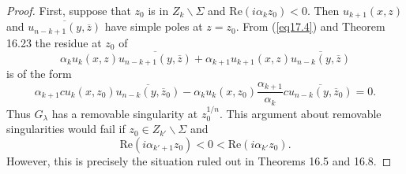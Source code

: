 \documentclass{surv-l}
\theoremstyle{plain}
\theoremstyle{definition}
\numberwithin{equation}{chapter}
\begin{document}
\begin{proof}  First,  suppose  that $z_{0}$ is in $ Z_{k}\backslash \Sigma$ and $\mathrm{Re}(i\alpha_{k}z_{0})<0$. Then $u_{k+1}(x,z)$ and $\overline{u_{n-k+1}(y,\overline{z})}$ have simple poles at $z=z_{0}$. From (\ref{eq17.4}) and Theorem 16.23 the residue at $z_{0}$ of
\begin{equation}\label{eq17.9}
\alpha_{k}u_{k}(x,z)\overline{u_{n-k+1}(y,\overline{z})}+\alpha_{k+1}u_{k+1}(x,z)\overline{u_{n-k}(y,\overline{z})}
\end{equation}
is of the form
\begin{equation}\label{eq17.10}
\alpha_{k+1}cu_{k}(x, z_{0})\overline{u_{n-k}(y,\overline{z}_{0})}-\alpha_{k}u_{k}(x,z_{0})\frac{\alpha_{k+1}}{\alpha_{k}}c\overline{u_{n-k}(y,\overline{z}_{0})}=0.
\end{equation}
Thus $G_{\lambda}$ has a removable singularity at $z_{0}^{1/n}$. This argument about removable singularities would fail if $ z_{0}\in Z_{k'}\backslash \Sigma$ and
\begin{equation*}
\mathrm{Re}(i\alpha_{k'+1}z_{0})<0<\mathrm{Re}(i\alpha_{k'}z_{0}).
\end{equation*}
However, this is precisely the situation ruled out in Theorems 16.5 and 16.8.


\end{proof}
\end{document}
